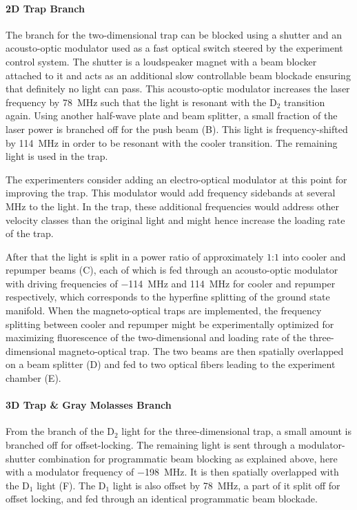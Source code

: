 \paragraph{2D Trap Branch} The branch for the two-dimensional trap can be blocked using a shutter and an acousto-optic modulator used as a fast optical switch steered by the experiment control system. The shutter is a loudspeaker magnet with a beam blocker attached to it and acts as an additional slow controllable beam blockade ensuring that definitely no light can pass. This acousto-optic modulator increases the laser frequency by \SI{+78}{\mega\hertz} such that the light is resonant with the D$_2$ transition again. Using another half-wave plate and beam splitter, a small fraction of the laser power is branched off for the push beam (B). This light is frequency-shifted by \SI{+114}{\mega\hertz} in order to be resonant with the cooler transition. The remaining light is used in the trap.

The experimenters consider adding an electro-optical modulator at this point for improving the trap. This modulator would add frequency sidebands at several \si{\mega\hertz} to the light. In the trap, these additional frequencies would address other velocity classes than the original light and might hence increase the loading rate of the trap.

After that the light is split in a power ratio of approximately $1$:$1$ into cooler and repumper beams (C), each of which is fed through an acousto-optic modulator with driving frequencies of \SI{-114}{\mega\hertz} and \SI{+114}{\mega\hertz} for cooler and repumper respectively, which corresponds to the hyperfine splitting of the ground state manifold. When the magneto-optical traps are implemented, the frequency splitting between cooler and repumper might be experimentally optimized for maximizing fluorescence of the two-dimensional and loading rate of the three-dimensional magneto-optical trap. The two beams are then spatially overlapped on a beam splitter (D) and fed to two optical fibers leading to the experiment chamber (E).

\paragraph{3D Trap \& Gray Molasses Branch} From the branch of the D$_2$ light for the three-dimensional trap, a small amount is branched off for offset-locking. The remaining light is sent through a modulator-shutter combination for programmatic beam blocking as explained above, here with a modulator frequency of \SI{-198}{\mega\hertz}. It is then spatially overlapped with the D$_1$ light (F). The D$_1$ light is also offset by \SI{+78}{\mega\hertz}, a part of it split off for offset locking, and fed through an identical programmatic beam blockade.

